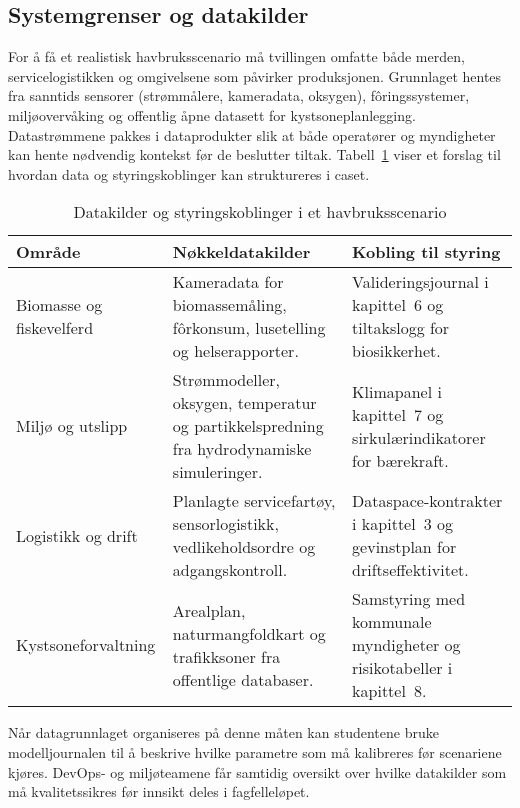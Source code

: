 \subsection{Systemgrenser og datakilder}
For å få et realistisk havbruksscenario må tvillingen omfatte både merden, servicelogistikken og omgivelsene som påvirker produksjonen. Grunnlaget hentes fra sanntids sensorer (strømmålere, kameradata, oksygen), fôringssystemer, miljøovervåking og offentlig åpne datasett for kystsoneplanlegging. Datastrømmene pakkes i dataprodukter slik at både operatører og myndigheter kan hente nødvendig kontekst før de beslutter tiltak. Tabell~\ref{tab:kap04-havbruk-data} viser et forslag til hvordan data og styringskoblinger kan struktureres i caset.

\begin{table}[htbp]
    \centering
    \caption{Datakilder og styringskoblinger i et havbruksscenario}
    \label{tab:kap04-havbruk-data}
    \begin{tabular}{p{}p{}p{}}
        \toprule
        \textbf{Område} & \textbf{Nøkkeldatakilder} & \textbf{Kobling til styring}\\
        \midrule
        Biomasse og fiskevelferd & Kameradata for biomassemåling, fôrkonsum, lusetelling og helserapporter. & Valideringsjournal i kapittel~6 og tiltakslogg for biosikkerhet.\\
        Miljø og utslipp & Strømmodeller, oksygen, temperatur og partikkelspredning fra hydrodynamiske simuleringer. & Klimapanel i kapittel~7 og sirkulærindikatorer for bærekraft.\\
        Logistikk og drift & Planlagte servicefartøy, sensorlogistikk, vedlikeholdsordre og adgangskontroll. & Dataspace-kontrakter i kapittel~3 og gevinstplan for driftseffektivitet.\\
        Kystsoneforvaltning & Arealplan, naturmangfoldkart og trafikksoner fra offentlige databaser. & Samstyring med kommunale myndigheter og risikotabeller i kapittel~8.\\
        \bottomrule
    \end{tabular}
\end{table}

Når datagrunnlaget organiseres på denne måten kan studentene bruke modelljournalen til å beskrive hvilke parametre som må kalibreres før scenariene kjøres. DevOps- og miljøteamene får samtidig oversikt over hvilke datakilder som må kvalitetssikres før innsikt deles i fagfelleløpet.

